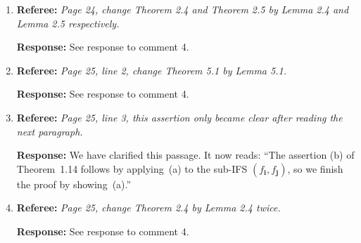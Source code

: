 \documentclass[11pt]{article}
\newcommand{\referee}[1]{\textbf{Referee:} \textit{#1}}
\newcommand{\response}[1]{\textbf{Response:} #1}
\begin{document}
\begin{enumerate}
  \response{Fixed. Changed $h$ to $k$.}

  \item \referee{Page 24, change Theorem 2.4 and Theorem 2.5 by Lemma 2.4 and Lemma 2.5 respectively.}

  \response{See response to comment 4.}

  \item \referee{Page 25, line 2, change Theorem 5.1 by Lemma 5.1.}

  \response{See response to comment 4.}

  \item \referee{Page 25, line 3, this assertion only became clear after reading the next paragraph.}

  \response{We have clarified this passage. It now reads: ``The assertion (b) of Theorem~1.14 follows by applying~(a) to the sub-IFS $(f_{\mathbf{i}}, f_{\mathbf{j}})$, so we finish the proof by showing~(a).''}

  \item \referee{Page 25, change Theorem 2.4 by Lemma 2.4 twice.}

  \response{See response to comment 4.}

\end{enumerate}
\end{document}
